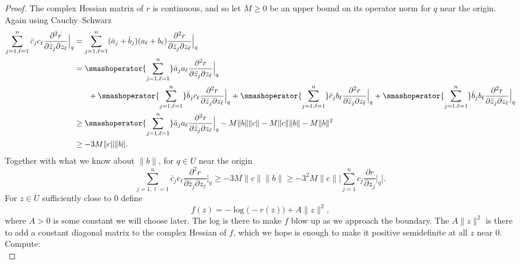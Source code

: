 \documentclass[12pt,openany]{book}
\newcommand{\snorm}[1]{\lVert {#1} \rVert}
\newcommand{\Babs}[1]{\Bigl\lvert {#1} \Bigr\rvert}
\newcommand{\BBabs}[1]{\Biggl\lvert {#1} \Biggr\rvert}
\theoremstyle{plain}
\theoremstyle{remark}
\theoremstyle{definition}
\theoremstyle{exercise}
\theoremstyle{example}
\begin{document}
\begin{proof}
\pagebreak[1]
The complex Hessian matrix of $r$ is continuous, and so let
$M \geq 0$ be an upper bound on its operator norm for $q$ near the origin.
Again using Cauchy--Schwarz
\begin{equation*}
\begin{split}
\sum_{j=1,\ell=1}^n
\bar{c}_j c_\ell \frac{\partial^2 r}{\partial \bar{z}_j \partial z_\ell} \Big|_q 
& =
\sum_{j=1,\ell=1}^n
( \bar{a}_j + \bar{b}_j )  (a_\ell + b_\ell) \frac{\partial^2 r}{\partial \bar{z}_j \partial z_\ell} \Big|_q 
\\
& =
\smashoperator{\sum_{j=1,\ell=1}^n}
\bar{a}_j a_\ell \frac{\partial^2 r}{\partial \bar{z}_j \partial z_\ell} \Big|_q 
\\
& \phantom{=} \quad
+
\smashoperator{\sum_{j=1,\ell=1}^n}
\bar{b}_j c_\ell \frac{\partial^2 r}{\partial \bar{z}_j \partial z_\ell} \Big|_q 
+
\smashoperator{\sum_{j=1,\ell=1}^n}
\bar{c}_j  b_\ell \frac{\partial^2 r}{\partial \bar{z}_j \partial z_\ell} \Big|_q 
+
\smashoperator{\sum_{j=1,\ell=1}^n}
\bar{b}_j  b_\ell \frac{\partial^2 r}{\partial \bar{z}_j \partial z_\ell} \Big|_q 
\\
& \geq
\smashoperator{\sum_{j=1,\ell=1}^n}
\bar{a}_j a_\ell \frac{\partial^2 r}{\partial \bar{z}_j \partial z_\ell} \Big|_q 
-
M\snorm{b}\snorm{c}
-
M\snorm{c}\snorm{b}
-
M\snorm{b}^2
\\
& \geq
-
3 M\snorm{c}\snorm{b} .
\end{split}
\end{equation*}
Together with what we know about
$\snorm{b}$, for $q \in U$ near the origin
\begin{equation*}
\sum_{j=1,\ell=1}^n
\bar{c}_j c_\ell \frac{\partial^2 r}{\partial \bar{z}_j \partial z_\ell} \Big|_q 
\geq -3M \snorm{c} \snorm{b} %
\geq
-3^2 M \snorm{c}\BBabs{\sum_{j=1}^n c_j \frac{\partial r}{\partial z_j}
\Big|_q} .
\end{equation*}
For $z \in U$ sufficiently close to $0$ define
\begin{equation*}
f(z) = -\log \bigl(-r(z)\bigr) + A \snorm{z}^2 ,
\end{equation*}
where $A > 0$ is some constant we will choose later.
The log is there to make $f$ blow up as we approach the boundary.
The $A \snorm{z}^2$ is there to add a constant diagonal matrix to the complex
Hessian of $f$, which we hope is enough to make it positive semidefinite at
all $z$ near $0$.
Compute:
\begin{equation*}

\end{equation*}
\end{proof}
\end{document}
